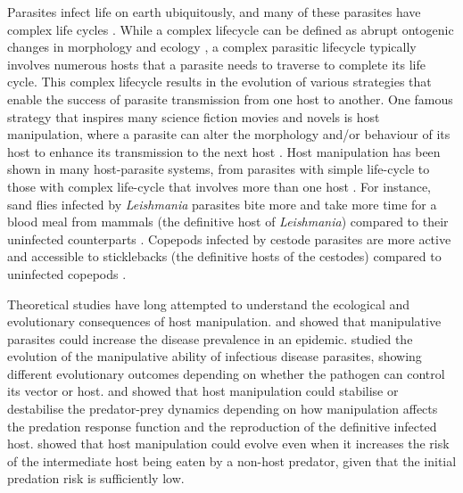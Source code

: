 \documentclass[a4paper]{scrartcl}
\begin{document}
Parasites infect life on earth ubiquitously, and many of these parasites have complex life cycles \citep{zimmer:book:2001}. 
While a complex lifecycle can be defined as abrupt ontogenic changes in morphology and ecology \citep{Benesh:2016dj}, a complex parasitic lifecycle typically involves numerous hosts that a parasite needs to traverse to complete its life cycle. 
This complex lifecycle results in the evolution of various strategies that enable the success of parasite transmission from one host to another. 
One famous strategy that inspires many science fiction movies and novels is host manipulation, where a parasite can alter the morphology and/or behaviour of its  host to enhance its transmission to the next host \citep{Hughes2012}. 
Host manipulation has been shown in many host-parasite systems, from parasites with simple life-cycle to those with complex life-cycle that involves more than one host \citep{Hughes2012,molyneux_jefferies1986}. 
For instance, sand flies infected by \textit{Leishmania} parasites bite more and take more time for a blood meal from mammals (the definitive host of \textit{Leishmania}) compared to their uninfected counterparts \citep{Rogers2007}. 
Copepods infected by cestode parasites are more active and accessible to sticklebacks (the definitive hosts of the cestodes) compared to uninfected copepods \citep{Wedekind1996}.

Theoretical studies have long attempted to understand the ecological and evolutionary consequences of host manipulation. 
\cite{Roosien2013} and \cite{Hosack2008} showed that manipulative parasites could increase the disease prevalence in an epidemic. \cite{Gandon2018} studied the evolution of the manipulative ability of infectious disease parasites, showing different evolutionary outcomes depending on whether the pathogen can control its vector or host.
\cite{Hadeler1989, Fenton2006} and \cite{Rogawa2018} showed that host manipulation could stabilise or destabilise the predator-prey dynamics depending on how manipulation affects the predation response function and the reproduction of the definitive infected host. 
\cite{Seppl2008} showed that host manipulation could evolve even when it increases the risk of the intermediate host being eaten by a non-host predator, given that the initial predation risk is sufficiently low.  
\end{document}
